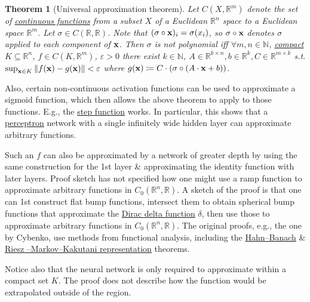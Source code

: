 \documentclass{article}
\newtheorem{theorem}{Theorem}
\begin{document}
\begin{theorem}[Universal approximation theorem]
	Let $C(X,\mathbb{R}^m)$ denote the set of \href{https://en.wikipedia.org/wiki/Continuous_functions}{continuous functions} from a subset $X$ of a Euclidean $\mathbb{R}^n$ space to a Euclidean space $\mathbb{R}^m$. Let $\sigma\in C(\mathbb{R},\mathbb{R})$. Note that $(\sigma\circ{\bf x})_i = \sigma(x_i)$, so $\sigma\circ{\bf x}$ denotes $\sigma$ applied to each component of ${\bf x}$. Then $\sigma$ is not polynomial iff $\forall m,n\in\mathbb{N}$, \href{https://en.wikipedia.org/wiki/Compact_subspace}{compact} $K\subseteq\mathbb{R}^n$, $f\in C(K,\mathbb{R}^m)$, $\varepsilon > 0$ there exist $k\in\mathbb{N}$, $A\in\mathbb{R}^{k\times n},b\in\mathbb{R}^k,C\in\mathbb{R}^{m\times k}$ s.t. $\sup_{{\bf x}\in K} \|f({\bf x}) - g({\bf x})\| < \varepsilon$ where $g({\bf x})\coloneqq C\cdot(\sigma\circ(A\cdot{\bf x} + b))$.
\end{theorem}
Also, certain non-continuous activation functions can be used to approximate a sigmoid function, which then allows the above theorem to apply to those functions. E.g., the \href{https://en.wikipedia.org/wiki/Step_function}{step function} works. In particular, this shows that a \href{https://en.wikipedia.org/wiki/Perceptron}{perceptron} network with a single infinitely wide hidden layer can approximate arbitrary functions.

Such an $f$ can also be approximated by a network of greater depth by using the same construction for the 1st layer \& approximating the identity function with later layers. {\sf Proof sketch} has not specified how one might use a ramp function to approximate arbitrary functions in $C_0(\mathbb{R}^n,\mathbb{R})$. A sketch of the proof is that one can 1st construct flat bump functions, intersect them to obtain spherical bump functions that approximate the \href{https://en.wikipedia.org/wiki/Dirac_delta_function}{Dirac delta function} $\delta$, then use those to approximate arbitrary functions in $C_0(\mathbb{R}^n,\mathbb{R})$. The original proofs, e.g., the one by Cybenko, use methods from functional analysis, including the \href{https://en.wikipedia.org/wiki/Hahn%E2%80%93Banach_theorem}{Hahn--Banach} \& \href{https://en.wikipedia.org/wiki/Riesz%E2%80%93Markov%E2%80%93Kakutani_representation_theorem}{Riesz --Markov--Kakutani representation} theorems.

Notice also that the neural network is only required to approximate within a compact set $K$. The proof does not describe how the function would be extrapolated outside of the region.
\end{document}
